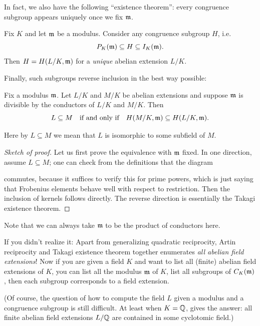 In fact, we also have the following ``existence theorem'':
every congruence subgroup appears uniquely once we fix $\mathfrak m$.
\begin{theorem}
	Fix $K$ and let $\mathfrak m$ be a modulus.
	Consider any congruence subgroup $H$, i.e.\
	\[ P_K(\mathfrak m) \subseteq H \subseteq I_K(\mathfrak m). \]
	Then $H = H(L/K, \mathfrak m)$ for a \emph{unique} abelian extension $L/K$.
\end{theorem}

Finally, such subgroups reverse inclusion in the best way possible:
\begin{lemma}
	Fix a modulus $\mathfrak m$.
	Let $L/K$ and $M/K$ be abelian extensions
	and suppose $\mathfrak m$ is divisible by the conductors of $L/K$ and $M/K$.
	Then
	\[ L \subseteq M
		\quad\text{if and only if}\quad
		H(M/K, \mathfrak m) \subseteq H(L/K, \mathfrak m).  \]
\end{lemma}
Here by $L \subseteq M$ we mean that $L$ is isomorphic to some subfield of $M$.
\begin{proof}
	[Sketch of proof]
	Let us first prove the equivalence with $\mathfrak m$ fixed.
	In one direction, assume $L \subseteq M$;
	one can check from the definitions that the diagram
	\begin{center}
	\end{center}
	commutes, because it suffices to verify this for prime powers,
	which is just saying that Frobenius elements behave well
	with respect to restriction.
	Then the inclusion of kernels follows directly.
	The reverse direction is essentially the Takagi existence theorem.
\end{proof}
Note that we can always take $\mathfrak m$ to be the product of conductors here.

If you didn't realize it: Apart from generalizing quadratic reciprocity, Artin reciprocity and
Takagi existence theorem together enumerates \emph{all abelian field extensions}!
Now if you are given a field $K$ and want to list all (finite) abelian field extensions of $K$,
you can list all the modulus $\mathfrak m$ of $K$, list all subgroups of $C_K(\mathfrak m)$, then each subgroup
corresponds to a field extension.

(Of course, the question of how to compute the field $L$ given a modulus and a congruence subgroup
is still difficult. At least when $K = \mathbb Q$, \Cref{prob:kronecker_weber_theorem} gives the answer:
all finite abelian field extensions $L/\mathbb Q$ are contained in some cyclotomic field.)

